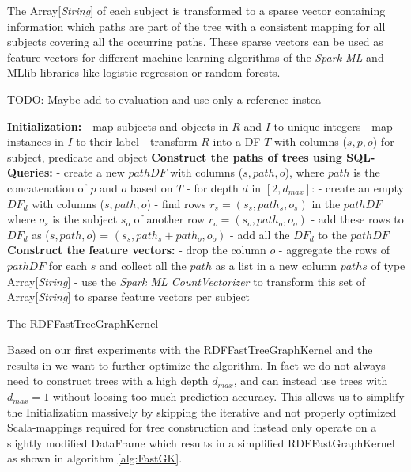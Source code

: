 \documentclass{easychair}
\begin{document}
The Array[\textit{String}] of each subject is transformed to a sparse vector containing information which paths are part of the tree with a consistent mapping for all subjects covering all the occurring paths. These sparse vectors can be used as feature vectors for different machine learning algorithms of the \textit{Spark ML} and {MLlib} libraries like logistic regression or random forests.

TODO: Maybe add to evaluation and use only a reference instea

\begin{algorithm}
 \label{alg:FTGK}
 \;
 \textbf{Initialization:}\; \Indp
 - map subjects and objects in $R$ and $I$ to unique integers\;
 - map instances in $I$ to their label\;
 - transform $R$ into a DF $T$ with columns ($s,p,o$) for subject, predicate and object\; \Indm
\; 
\textbf{Construct the paths of trees using SQL-Queries:}\; \Indp
- create a new $pathDF$ with columns ($s,path,o$), where $path$ is the concatenation of $p$ and $o$ based on $T$\;
- for depth $d$ in $[2,d_{max}]$:\; \Indp
- create an empty $DF_d$ with columns ($s,path,o$)\;
- find rows $r_s = (s_s,path_s,o_s)$ in the $pathDF$ where $o_s$ is the subject $s_o$ of another row $r_o=(s_o,path_o,o_o)$\;
- add these rows to $DF_d$ as ($s,path,o$) = $(s_s,path_s+path_o,o_o)$\; \Indm
- add all the $DF_d$ to the $pathDF$\; \Indm
 \;
 \textbf{Construct the feature vectors:}\; \Indp
 - drop the column $o$\;
 - aggregate the rows of $pathDF$ for each $s$ and collect all the $path$ as a list in a new column $paths$ of type Array[\textit{String}]\;
 - use the \textit{Spark ML CountVectorizer} to transform this set of Array[\textit{String}] to sparse feature vectors per subject\;
 \;
\caption{The RDFFastTreeGraphKernel}
\end{algorithm}

Based on our first experiments with the RDFFastTreeGraphKernel and the results in \cite{FGK} we want to further optimize the algorithm. In fact we do not always need to construct trees with a high depth $d_{max}$, and can instead use trees with $d_{max}=1$ without loosing too much prediction accuracy. This allows us to simplify the Initialization massively by skipping the iterative and not properly optimized Scala-mappings required for tree construction and instead only operate on a slightly modified DataFrame which results in a simplified RDFFastGraphKernel as shown in algorithm \ref{alg:FastGK}.
\end{document}
